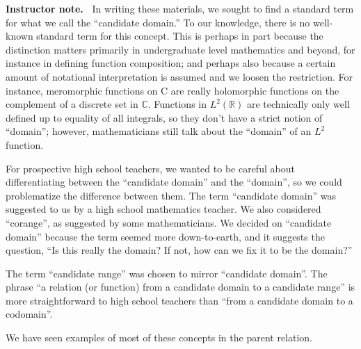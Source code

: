 \documentclass[11pt]{article}
\newenvironment{bignote}[1][Instructor note]%
	{\begin{mdframed}\raggedright{\bf #1.~}}
	{\end{mdframed}}
\theoremstyle{definition}
\begin{document}
\begin{bignote}
In writing these materials, we sought to find a standard term for what we call the ``candidate domain.'' To our knowledge, there is no well-known standard term for this concept. This is perhaps in part because the distinction matters primarily in undergraduate level mathematics and beyond, for instance in defining function composition; and perhaps also because a certain amount of notational interpretation is assumed and we loosen the restriction. For instance, meromorphic functions on C are really holomorphic functions on the complement of a discrete set in $\mathbb{C}$. Functions in
$L^2(\mathbb{R})$ are technically only well defined up to equality of all integrals, so
they don't have a strict notion of  ``domain''; however, mathematicians still talk about the ``domain'' of an  $L^2$ function.

For prospective high school teachers, we wanted to be careful about differentiating between the ``candidate domain'' and the ``domain'', so we could problematize the difference between them. The term ``candidate domain'' was suggested to us by a high school mathematics teacher. We also considered ``corange'', as suggested by some mathematicians. We decided on ``candidate domain'' because the term seemed more down-to-earth, and it suggests the question, ``Is this really the domain? If not, how can we fix it to be the domain?''

The term ``candidate range'' was chosen to mirror ``candidate domain''. The phrase ``a relation (or function) from a candidate domain to a candidate range'' is more straightforward to high school teachers than ``from a candidate domain to a codomain''.  \end{bignote}

We have seen examples of most of these concepts in the parent relation. 
\end{document}
